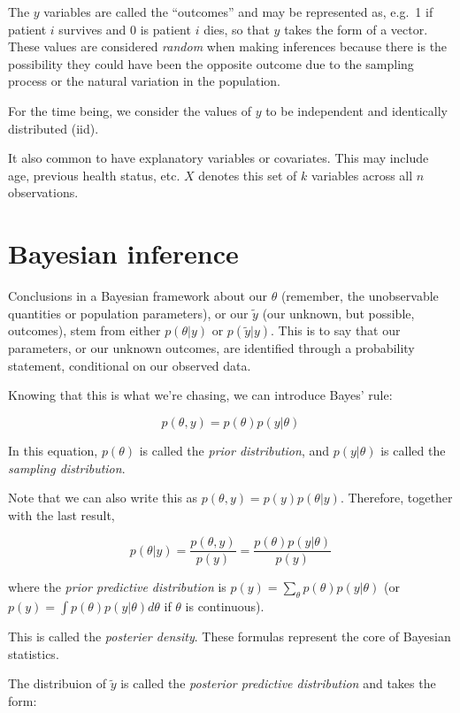 \documentclass[]{book}
\begin{document}
The \(y\) variables are called the ``outcomes'' and may be represented
as, e.g.~1 if patient \(i\) survives and 0 is patient \(i\) dies, so
that \(y\) takes the form of a vector. These values are considered
\emph{random} when making inferences because there is the possibility
they could have been the opposite outcome due to the sampling process or
the natural variation in the population.

For the time being, we consider the values of \(y\) to be independent
and identically distributed (iid).

It also common to have explanatory variables or covariates. This may
include age, previous health status, etc. \(X\) denotes this set of
\(k\) variables across all \(n\) observations.

\section{Bayesian inference}\label{bayesian-inference}

Conclusions in a Bayesian framework about our \(\theta\) (remember, the
unobservable quantities or population parameters), or our \(\tilde{y}\)
(our unknown, but possible, outcomes), stem from either
\(p(\theta | y)\) or \(p(\tilde{y} | y)\). This is to say that our
parameters, or our unknown outcomes, are identified through a
probability statement, conditional on our observed data.

Knowing that this is what we're chasing, we can introduce Bayes' rule:

\[
p(\theta, y) = p(\theta)p(y|\theta)
\]

In this equation, \(p(\theta)\) is called the \emph{prior distribution},
and \(p(y|\theta)\) is called the \emph{sampling distribution}.

Note that we can also write this as \(p(\theta, y) = p(y)p(\theta|y)\).
Therefore, together with the last result,

\[
p(\theta|y) = \frac{p(\theta,y)}{p(y)} = \frac{p(\theta)p(y|\theta)}{p(y)}
\]

where the \emph{prior predictive distribution} is
\(p(y) = \sum_\theta p(\theta)p(y|\theta)\) (or
\(p(y)=\int p(\theta)p(y|\theta)d\theta\) if \(\theta\) is continuous).

This is called the \emph{posterier density}. These formulas represent
the core of Bayesian statistics.

The distribuion of \(\tilde{y}\) is called the \emph{posterior
predictive distribution} and takes the form:
\end{document}

